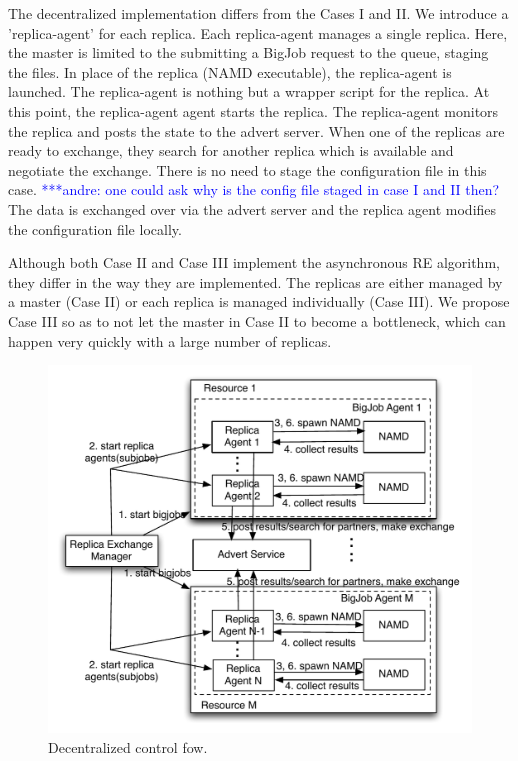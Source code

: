 \documentclass[a4paper,10pt]{article}
\newcommand{\alnote}[1]{ {\textcolor{blue} { ***andre: #1 }}}
\newcommand{\alnote}[1]{}
\begin{document}
The decentralized implementation differs from the Cases I and II. We introduce 
a 'replica-agent' for each replica. Each replica-agent manages a single replica. 
Here, the master is limited to the submitting a BigJob request to the queue, 
staging the files. In place of the replica (NAMD executable), the replica-agent 
is launched. The replica-agent is nothing but a wrapper script for the replica. 
At this point, the replica-agent agent starts the replica. The replica-agent 
monitors the replica and posts the state to the advert server. When one of the 
replicas are ready to exchange, they search for another replica which is 
available and negotiate the exchange. There is no need to stage the 
configuration file in this case. \alnote {one could ask why is the 
config file staged in case I and II then?} The data is exchanged over via the 
advert server and the replica agent modifies the configuration file locally.

Although both Case II and Case III implement the asynchronous RE algorithm, they differ in the way they are implemented. The replicas are either managed by a master (Case II) or each replica is managed individually (Case III). We propose Case III so as to not let the master in Case II to become a bottleneck, which can happen very quickly with a large number of replicas.

\begin{figure}
\centering
\includegraphics[width=1\textwidth]{figures/asyncre.pdf}
\caption{\small Decentralized control fow.}
\label{fig:decent}
\end{figure}
\end{document}
